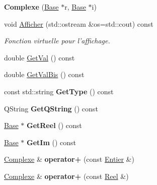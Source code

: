 \begin{DoxyCompactItemize}
\item 
\hypertarget{class_complexe_afbc9334c87c0d03105c6b83cffa91ba6}{{\bfseries Complexe} (\hyperlink{class_base}{Base} $\ast$r, \hyperlink{class_base}{Base} $\ast$i)}\label{class_complexe_afbc9334c87c0d03105c6b83cffa91ba6}

\item 
void \hyperlink{class_complexe_ab81a9988e1a69cae64682e5030de5901}{Afficher} (std\-::ostream \&os=std\-::cout) const 
\begin{DoxyCompactList}\small\item\em Fonction virtuelle pour l'affichage. \end{DoxyCompactList}\item 
double \hyperlink{class_complexe_ab3a3d0582d701ba9fa7ce45d7e82eb81}{Get\-Val} () const 
\item 
double \hyperlink{class_complexe_acfe2a56e2024db9eca2039fccdb2d6f4}{Get\-Val\-Bis} () const 
\item 
\hypertarget{class_complexe_aee55b37e0370e38f3aeedbbf25977876}{const std\-::string {\bfseries Get\-Type} () const }\label{class_complexe_aee55b37e0370e38f3aeedbbf25977876}

\item 
\hypertarget{class_complexe_a32c9167b86fd9cfccb1295c2eecc516e}{Q\-String {\bfseries Get\-Q\-String} () const }\label{class_complexe_a32c9167b86fd9cfccb1295c2eecc516e}

\item 
\hypertarget{class_complexe_a5f39994e59be2809629c9d9deac7539c}{\hyperlink{class_base}{Base} $\ast$ {\bfseries Get\-Reel} () const }\label{class_complexe_a5f39994e59be2809629c9d9deac7539c}

\item 
\hypertarget{class_complexe_ae57b14f197af61edf80f5c0b46373a2f}{\hyperlink{class_base}{Base} $\ast$ {\bfseries Get\-Im} () const }\label{class_complexe_ae57b14f197af61edf80f5c0b46373a2f}

\item 
\hypertarget{class_complexe_a8f564d48149e48b0a0bbb230a6010782}{\hyperlink{class_complexe}{Complexe} \& {\bfseries operator+} (const \hyperlink{class_entier}{Entier} \&)}\label{class_complexe_a8f564d48149e48b0a0bbb230a6010782}

\item 
\hypertarget{class_complexe_a1a2eae6f18f1bd6889ea6d588db49b1f}{\hyperlink{class_complexe}{Complexe} \& {\bfseries operator+} (const \hyperlink{class_reel}{Reel} \&)}\label{class_complexe_a1a2eae6f18f1bd6889ea6d588db49b1f}


\end{DoxyCompactItemize}
